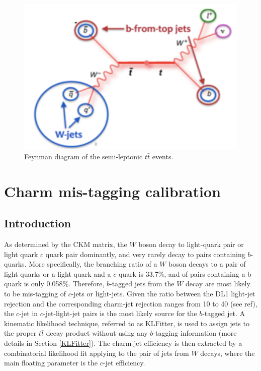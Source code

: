 \documentclass[letterpaper,12pt]{article}
\begin{document}
\begin{figure}[H]
\centering
\begin{minipage}[b]{.45\textwidth}
\centering
\includegraphics[width=1\textwidth]{feynman.png}
\end{minipage}
\caption{Feynman diagram of the semi-leptonic $t\bar{t}$ events.}
\label{fig:feynman}
\end{figure}
\section{Charm mis-tagging calibration}
\label{charm mistagging}
\subsection{Introduction}
As determined by the CKM matrix\cite{CKM1}\cite{CKM2}, the $W$ boson decay to light-quark pair or 
light quark $c$ quark pair dominantly, and very rarely decay to pairs containing $b$-quarks. 
More specifically, the branching ratio of a $W$ boson decays to a pair of light quarks or a light quark 
and a $c$ quark is 33.7\%, and of pairs containing a b quark is only 0.058\%\cite{PDG}. 
Therefore, $b$-tagged jets from the $W$ decay are most likely to be mis-tagging of $c$-jets or 
light-jets. Given the ratio between the DL1 light-jet rejection and the corresponding charm-jet rejection 
ranges from 10 to 40 (see ref\cite{ATL-PHYS-PUB-2017-013}), the 
$c$-jet in $c$-jet-light-jet pairs is the most likely source for the 
$b$-tagged jet. A kinematic likelihood technique, referred to as 
KLFitter\cite{ERDMANN201418}, is used to assign jets to the proper $t\bar{t}$ decay product 
without using any $b$-tagging information (more details in Section \ref{KLFitter}). 
The charm-jet efficiency is then extracted by a combinatorial likelihood fit applying to the pair 
of jets from $W$ decays, where the main floating parameter is the $c$-jet efficiency\cite{cjet}. 
\end{document}
